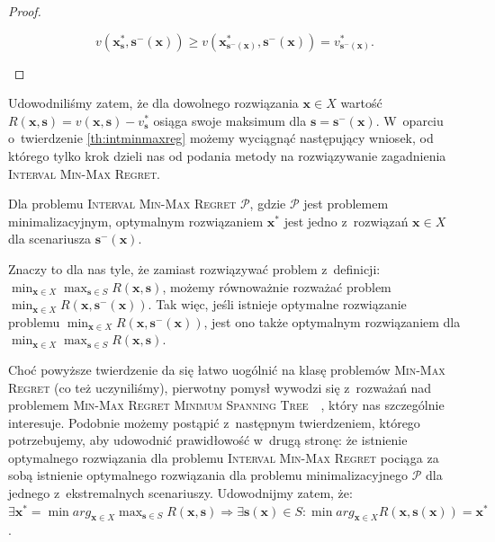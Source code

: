 \begin{proof}
\begin{itemize}
		\begin{equation*}
			v \left( \textbf{x}^{\ast}_{\textbf{s}}, \textbf{s}^{-} \left( \textbf{x} \right) \right) \geqslant v \left( \textbf{x}^{\ast}_{\textbf{s}^{-} \left( \textbf{x} \right)}, \textbf{s}^{-} \left( \textbf{x} \right) \right) = v^{\ast}_{\textbf{s}^{-} \left( \textbf{x} \right)}\text{.}
		\end{equation*}
	\end{itemize}
\end{proof}

Udowodniliśmy zatem, że dla dowolnego rozwiązania $\textbf{x} \in X$ wartość $R \left( \textbf{x}, \textbf{s} \right) = v \left( \textbf{x}, \textbf{s} \right) - v^{\ast}_{\textbf{s}}$ osiąga swoje maksimum dla $\textbf{s} = \textbf{s}^{-} \left( \textbf{x} \right)$.
W~oparciu o~twierdzenie \ref{th:intminmaxreg} możemy wyciągnąć następujący wniosek, od którego tylko krok dzieli nas od podania metody na rozwiązywanie zagadnienia \textsc{Interval Min-Max Regret}.

\begin{corollary}
	Dla problemu \textsc{Interval Min-Max Regret $\mathcal{P}$}, gdzie $\mathcal{P}$ jest problemem minimalizacyjnym, optymalnym rozwiązaniem $\textbf{x}^{\ast}$ jest jedno z~rozwiązań $\textbf{x} \in X$ dla scenariusza $\textbf{s}^{-} \left( \textbf{x} \right)$.
\end{corollary}

Znaczy to dla nas tyle, że zamiast rozwiązywać problem z~definicji: $\min_{\textbf{x} \in X} \max_{\textbf{s} \in S} R \left( \textbf{x}, \textbf{s} \right)$, możemy równoważnie rozważać problem $\min_{\textbf{x} \in X} R \left( \textbf{x}, \textbf{s}^{-} \left( \textbf{x} \right) \right)$.
Tak więc, jeśli istnieje optymalne rozwiązanie problemu $\min_{\textbf{x} \in X} R \left( \textbf{x}, \textbf{s}^{-} \left( \textbf{x} \right) \right)$, jest ono także optymalnym rozwiązaniem dla $\min_{\textbf{x} \in X} \max_{\textbf{s} \in S} R \left( \textbf{x}, \textbf{s} \right)$.

Choć powyższe twierdzenie da się łatwo uogólnić na klasę problemów \textsc{Min-Max Regret} (co też uczyniliśmy), pierwotny pomysł wywodzi się z~rozważań nad problemem \textsc{Min-Max Regret Minimum Spanning Tree}~\cite[$429$--$430$]{minmaxSurvey}~\cite{robustSTP}, który nas szczególnie interesuje.
Podobnie możemy postąpić z~następnym twierdzeniem, którego potrzebujemy, aby udowodnić prawidłowość w~drugą stronę: że istnienie optymalnego rozwiązania dla problemu \textsc{Interval Min-Max Regret} pociąga za sobą istnienie optymalnego rozwiązania dla problemu minimalizacyjnego $\mathcal{P}$ dla jednego z~ekstremalnych scenariuszy.
Udowodnijmy zatem, że: $\exists \textbf{x}^{\ast} = \min arg_{\textbf{x} \in X} \max_{\textbf{s} \in S} R \left( \textbf{x}, \textbf{s} \right) \Rightarrow \exists \textbf{s} \left( \textbf{x} \right) \in S : \min arg_{\textbf{x} \in X} R \left( \textbf{x}, \textbf{s} \left( \textbf{x} \right) \right) = \textbf{x}^{\ast}$.

